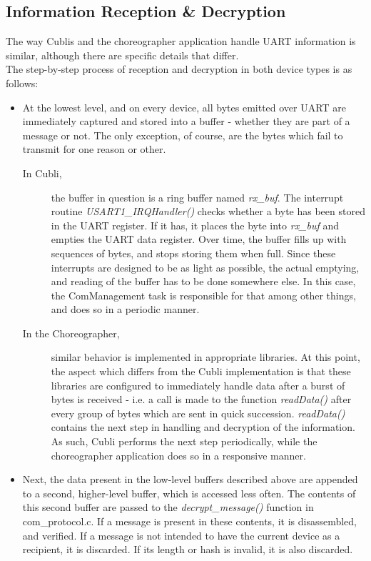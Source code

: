 \subsection{Information Reception \& Decryption}\label{sec:receptionanddecryption}

The way Cublis and the choreographer application handle UART information is similar, although there are specific details that differ.\\

The step-by-step process of reception and decryption in both device types is as follows:\\

\begin{itemize}
\item At the lowest level, and on every device, all bytes emitted over UART are immediately captured and stored into a buffer - whether they are part of a message or not. The only exception, of course, are the bytes which fail to transmit for one reason or other.

\begin{description}
\item[In Cubli,] the buffer in question is a ring buffer named \textit{rx\_buf}. The interrupt routine \textit{USART1\_IRQHandler()} checks whether a byte has been stored in the UART register. If it has, it places the byte into \textit{rx\_buf} and empties the UART data register. Over time, the buffer fills up with sequences of bytes, and stops storing them when full. Since these interrupts are designed to be as light as possible, the actual emptying, and reading of the buffer has to be done somewhere else. In this case, the ComManagement task is responsible for that among other things, and does so in a periodic manner.
\item[In the Choreographer,] similar behavior is implemented in appropriate libraries. At this point, the aspect which differs from the Cubli implementation is that these libraries are configured to immediately handle data after a burst of bytes is received - i.e. a call is made to the function \textit{readData()} after every group of bytes which are sent in quick succession. \textit{readData()} contains the next step in handling and decryption of the information.
As such, Cubli performs the next step periodically, while the choreographer application does so in a responsive manner.
\end{description}

\item Next, the data present in the low-level buffers described above are appended to a second, higher-level buffer, which is accessed less often. The contents of this second buffer are passed to the \textit{decrypt\_message()} function in com\_protocol.c. If a message is present in these contents, it is disassembled, and verified. If a message is not intended to have the current device as a recipient, it is discarded. If its length or hash is invalid, it is also discarded.


\end{itemize}
